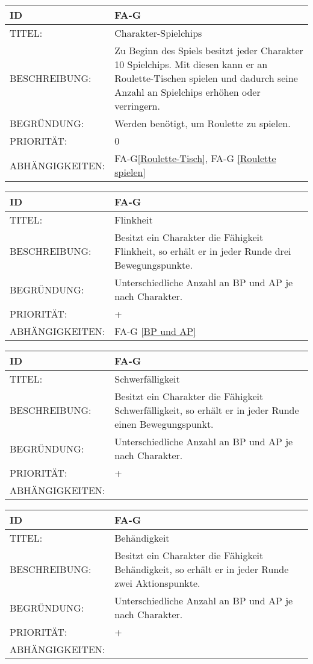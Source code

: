 \begin{tabularx}{16cm}{l|X}
	{table}\label{Charakter-Spielchips}
	\textbf{ID} & \textbf{FA-G \arabic{table}} \\
	\hline
	TITEL: & Charakter-Spielchips \\
	\hline
	BESCHREIBUNG: & Zu Beginn des Spiels besitzt jeder Charakter 10 Spielchips. Mit diesen kann er an Roulette-Tischen spielen und dadurch seine Anzahl an Spielchips erhöhen oder verringern.\\
	\hline
	BEGRÜNDUNG: & Werden benötigt, um Roulette zu spielen.\\
	\hline
	PRIORITÄT: & 0\\
	\hline
	ABHÄNGIGKEITEN: & FA-G\ref{Roulette-Tisch}, FA-G \ref{Roulette spielen}\\
\end{tabularx}

\begin{tabularx}{16cm}{l|X}
	{table}\label{Flinkheit}
	\textbf{ID} & \textbf{FA-G \arabic{table}} \\
	\hline
	TITEL: & Flinkheit \\
	\hline
	BESCHREIBUNG: & Besitzt ein Charakter die Fähigkeit Flinkheit, so erhält er in jeder Runde drei Bewegungspunkte.\\
	\hline
	BEGRÜNDUNG: & Unterschiedliche Anzahl an BP und AP je nach Charakter.\\
	\hline
	PRIORITÄT: & +\\
	\hline
	ABHÄNGIGKEITEN: & FA-G \ref{BP und AP}\\
\end{tabularx}

\begin{tabularx}{16cm}{l|X}
	{table}\label{Schwerfaelligkeit}
	\textbf{ID} & \textbf{FA-G \arabic{table}} \\
	\hline
	TITEL: & Schwerfälligkeit \\
	\hline
	BESCHREIBUNG: & Besitzt ein Charakter die Fähigkeit Schwerfälligkeit, so erhält er in jeder Runde einen Bewegungspunkt.\\
	\hline
	BEGRÜNDUNG: & Unterschiedliche Anzahl an BP und AP je nach Charakter.\\
	\hline
	PRIORITÄT: & +\\
	\hline
	ABHÄNGIGKEITEN: & \\
\end{tabularx}

\begin{tabularx}{16cm}{l|X}
	{table}\label{Behaendigkeit}
	\textbf{ID} & \textbf{FA-G \arabic{table}} \\
	\hline
	TITEL: & Behändigkeit \\
	\hline
	BESCHREIBUNG: & Besitzt ein Charakter die Fähigkeit Behändigkeit, so erhält er in jeder Runde zwei Aktionspunkte.\\
	\hline
	BEGRÜNDUNG: & Unterschiedliche Anzahl an BP und AP je nach Charakter.\\
	\hline
	PRIORITÄT: & +\\
	\hline
	ABHÄNGIGKEITEN: & \\
\end{tabularx}

